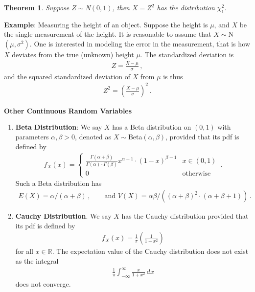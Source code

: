 \documentclass[11pt,oneside]{book}
\theoremstyle{newStyle}
\newtheorem{thm}{Theorem}[chapter]
\newcommand{\R}{\mathbb{R}}
\begin{document}
\begin{thm}
Suppose $Z \sim$N$(0,1)$, then $X = Z^2$ has the distribution $\chi_1^2$. 
\end{thm}

\textbf{Example}: Measuring the height of an object. Suppose the height is $\mu$, and $X$ be the single measurement of the height. It is reasonable to assume that $X\sim$N$(\mu, \sigma^2)$. One is interested in modeling the error in the measurement, that is how $X$ deviates from the true (unknown) height $\mu$. The standardized deviation is 
\begin{align*}
Z = \frac{X-\mu}{\sigma}\,,
\end{align*} 
and the squared standardized deviation of $X$ from $\mu$ is thus
\begin{align*}
Z^2 = \left( \frac{X -\mu}{\sigma}\right)^2\,.
\end{align*}

\textbf{Other Continuous Random Variables}
\begin{enumerate}
\item \textbf{Beta Distribution}: We say $X$ has a Beta distribution on $(0,1)$ with parameters $\alpha, \beta>0$, denoted as $X \sim$Beta$(\alpha,\beta)$, provided that its pdf is defined by
\begin{align*}
f_X(x) = \begin{cases}
\frac{\Gamma(\alpha+\beta)}{\Gamma(\alpha) \cdot \Gamma(\beta)} x^{\alpha-1}\cdot (1-x)^{\beta - 1} & x\in (0,1) \\ 0 &\text{otherwise}
\end{cases}\,.
\end{align*}
Such a Beta distribution has 
\begin{align*}
E(X) = \alpha/(\alpha+\beta)\,,\qquad\text{and } V(X) = \alpha\beta/ ((\alpha+\beta)^2 \cdot (\alpha+\beta +1))\,.
\end{align*} 
\item \textbf{Cauchy Distribution}. We say $X$ has the Cauchy distribution provided that its pdf is defined by
\begin{align*}
f_X(x) = \frac{1}{\pi}\left( \frac{1}{1+x^2}\right) 
\end{align*}
for all $x \in \R$. The expectation value of the Cauchy distribution does not exist as the integral 
\begin{align*}
\frac{1}{\pi}\int_{-\infty}^\infty \frac{x}{1+x^2}\,dx
\end{align*}
does not converge. 
\end{enumerate}
\end{document}
